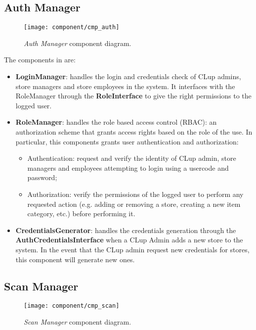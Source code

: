 \subsection{Auth Manager}

\begin{figure}[H]
	\centering
	\texttt{[image: component/cmp\_auth]}
	\caption{\textit{Auth Manager} component diagram.}
	\label{fig:cmp_auth}
\end{figure}

The components in  are:
\begin{itemize}
	\item \textbf{LoginManager}: handles the login and credentials check of CLup admins, store managers and store employees in the system. It interfaces with the RoleManager through the \textbf{RoleInterface} to give the right permissions to the logged user.
	
	\item \textbf{RoleManager}: handles the role based access control (RBAC): an authorization scheme that grants access rights based on the role of the use. In particular, this components grants user authentication and authorization:
	\begin{itemize}
		\item Authentication: request and verify the identity of CLup admin, store managers and employees attempting to login using a usercode and password;
		\item Authorization: verify the permissions of the logged user to perform any requested action (e.g. adding or removing a store, creating a new item category, etc.) before performing it.
	\end{itemize}
		
	\item \textbf{CredentialsGenerator}: handles the credentials generation through the \textbf{AuthCredentialsInterface} when a CLup Admin adds a new store to the system. In the event that the CLup admin request new credentials for stores, this component will generate new ones.
\end{itemize}


\subsection{Scan Manager}

\begin{figure}[H]
	\centering
	\texttt{[image: component/cmp\_scan]}
	\caption{\textit{Scan Manager} component diagram.}
	\label{fig:cmp_scan}
\end{figure}

